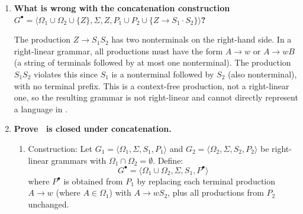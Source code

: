 \begin{enumerate}[{8.}1. ]
The grammar is $H = \langle\{A,B,S\},\{\pmb{a},\pmb{b},\pmb{c}\},S,\{S\to\pmb{a}SB\pmb{c},S\to\lambda,SB\to\pmb{b}S,\pmb{c}B\to B\pmb{c}\}\rangle$.

This is a context-sensitive grammar. We trace derivations:
\begin{align*}
S &\Rightarrow \lambda \\
S &\Rightarrow \pmb{a}SB\pmb{c} \Rightarrow \pmb{a}B\pmb{c} \Rightarrow \pmb{a}B\pmb{c}
\end{align*}
But $SB \to \pmb{b}S$ requires $S$ immediately before $B$: $\pmb{a}SB\pmb{c} \Rightarrow \pmb{a}\pmb{b}S\pmb{c} \Rightarrow \pmb{ab}\pmb{c}$.
\begin{align*}
S &\Rightarrow \pmb{a}SB\pmb{c} \Rightarrow \pmb{a}\pmb{a}SB\pmb{c}B\pmb{c}
\Rightarrow \pmb{aa}SB\pmb{c}B\pmb{c}
\end{align*}
Using $SB \to \pmb{b}S$: $\pmb{aa}\pmb{b}S\pmb{c}B\pmb{c}$.
Using $\pmb{c}B \to B\pmb{c}$: $\pmb{aab}SB\pmb{c}\pmb{c}$.
Using $SB \to \pmb{b}S$: $\pmb{aabb}S\pmb{c}\pmb{c} \Rightarrow \pmb{aabb}\pmb{cc}$.
In general: $L(H) = \{\pmb{a}^n\pmb{b}^n\pmb{c}^n \mid n \geq 0\}$.

\item \textbf{What is wrong with the concatenation construction $G^\bullet = \langle\Omega_1\cup\Omega_2\cup\{Z\},\Sigma,Z,P_1\cup P_2\cup\{Z\to S_1\cdot S_2\}\rangle$?}

The production $Z \to S_1 S_2$ has two nonterminals on the right-hand side. In a right-linear grammar, all productions must have the form $A \to w$ or $A \to wB$ (a string of terminals followed by at most one nonterminal). The production $S_1 S_2$ violates this since $S_1$ is a nonterminal followed by $S_2$ (also nonterminal), with no terminal prefix. This is a context-free production, not a right-linear one, so the resulting grammar is not right-linear and cannot directly represent a language in \GSIG.

\item \textbf{Prove \GSIG\ is closed under concatenation.}

\begin{enumerate}
\item Construction: Let $G_1 = \langle\Omega_1,\Sigma,S_1,P_1\rangle$ and $G_2 = \langle\Omega_2,\Sigma,S_2,P_2\rangle$ be right-linear grammars with $\Omega_1 \cap \Omega_2 = \emptyset$. Define:
\[
G^\bullet = \langle\Omega_1\cup\Omega_2,\Sigma,S_1,P^\bullet\rangle
\]
where $P^\bullet$ is obtained from $P_1$ by replacing each terminal production $A \to w$ (where $A \in \Omega_1$) with $A \to wS_2$, plus all productions from $P_2$ unchanged.


\end{enumerate}
\end{enumerate}
